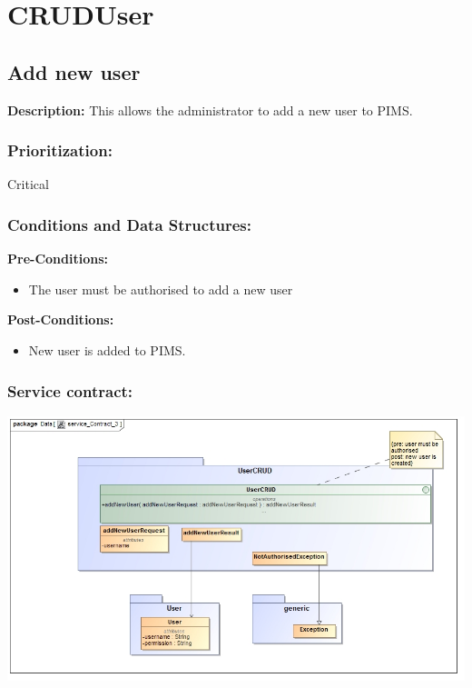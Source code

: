 
\section{CRUDUser}

\subsection{Add new user}
\textbf{Description:}
This allows the administrator to add a new user to PIMS.
\subsubsection{Prioritization:}
Critical
\subsubsection{Conditions and Data Structures:}
\textbf{Pre-Conditions:}
\begin{itemize}
	\item The user must be authorised to add a new user
\end{itemize}

\textbf{Post-Conditions:}	
\begin{itemize}
	\item New user is added to PIMS.
\end{itemize}

\subsubsection{Service contract:}
\includegraphics[width=1\linewidth]{./Graphics/4.jpg}
